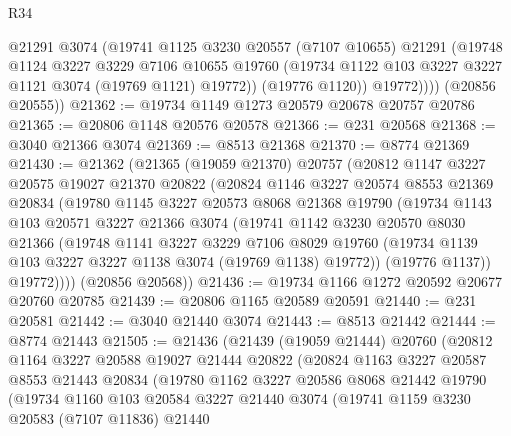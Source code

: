\begin{lexlean}{R34}
\begin{coremodule}
              @21291
              @3074
              (@19741
                @1125
                @3230
                @20557
                (@7107 @10655)
                @21291
                (@19748
                  @1124
                  @3227
                  @3229
                  @7106
                  @10655
                  @19760
                  (@19734 @1122 @103 @3227 @3227 @1121 @3074 (@19769 @1121) @19772))
                (@19776 @1120))
              @19772))))
      (@20856 @20555))
@21362 := @19734 @1149 @1273 @20579 @20678 @20757 @20786
@21365 := @20806 @1148 @20576 @20578
@21366 := @231 @20568
@21368 := @3040 @21366 @3074
@21369 := @8513 @21368
@21370 := @8774 @21369
@21430 := @21362
    (@21365
      (@19059 @21370)
      @20757
      (@20812
        @1147
        @3227
        @20575
        @19027
        @21370
        @20822
        (@20824
          @1146
          @3227
          @20574
          @8553
          @21369
          @20834
          (@19780
            @1145
            @3227
            @20573
            @8068
            @21368
            @19790
            (@19734
              @1143
              @103
              @20571
              @3227
              @21366
              @3074
              (@19741
                @1142
                @3230
                @20570
                @8030
                @21366
                (@19748
                  @1141
                  @3227
                  @3229
                  @7106
                  @8029
                  @19760
                  (@19734 @1139 @103 @3227 @3227 @1138 @3074 (@19769 @1138) @19772))
                (@19776 @1137))
              @19772))))
      (@20856 @20568))
@21436 := @19734 @1166 @1272 @20592 @20677 @20760 @20785
@21439 := @20806 @1165 @20589 @20591
@21440 := @231 @20581
@21442 := @3040 @21440 @3074
@21443 := @8513 @21442
@21444 := @8774 @21443
@21505 := @21436
    (@21439
      (@19059 @21444)
      @20760
      (@20812
        @1164
        @3227
        @20588
        @19027
        @21444
        @20822
        (@20824
          @1163
          @3227
          @20587
          @8553
          @21443
          @20834
          (@19780
            @1162
            @3227
            @20586
            @8068
            @21442
            @19790
            (@19734
              @1160
              @103
              @20584
              @3227
              @21440
              @3074
              (@19741
                @1159
                @3230
                @20583
                (@7107 @11836)
                @21440

\end{coremodule}
\end{lexlean}
